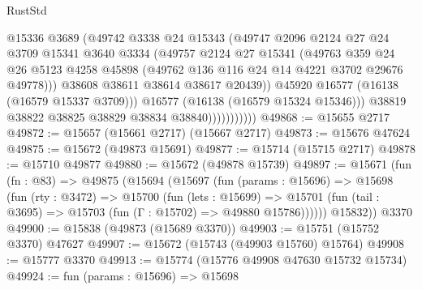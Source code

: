 \begin{lexlean}{RustStd}
\begin{coremodule}
                              @15336
                              @3689
                              (@49742
                                @3338
                                @24
                                @15343
                                (@49747
                                  @2096
                                  @2124
                                  @27
                                  @24
                                  @3709
                                  @15341
                                  @3640
                                  @3334
                                  (@49757
                                    @2124
                                    @27
                                    @15341
                                    (@49763
                                      @359
                                      @24
                                      @26
                                      @5123
                                      @4258
                                      @45898
                                      (@49762 @136 @116 @24 @14 @4221 @3702 @29676 @49778)))
                                  @38608
                                  @38611
                                  @38614
                                  @38617
                                  @20439))
                              @45920
                              @16577
                              (@16138 (@16579 @15337 @3709)))
                            @16577
                            (@16138 (@16579 @15324 @15346)))
                          @38819
                          @38822
                          @38825
                          @38829
                          @38834
                          @38840)))))))))))
@49868 := @15655 @2717
@49872 := @15657 (@15661 @2717) (@15667 @2717)
@49873 := @15676 @47624
@49875 := @15672 (@49873 @15691)
@49877 := @15714 (@15715 @2717)
@49878 := @15710 @49877
@49880 := @15672 (@49878 @15739)
@49897 := @15671
    (fun (fn : @83) =>
    @49875
      (@15694
        (@15697
          (fun (params : @15696) =>
          @15698
            (fun (rty : @3472) =>
            @15700
              (fun (lets : @15699) =>
              @15701 (fun (tail : @3695) => @15703 (fun (Γ : @15702) => @49880 @15786))))))
        @15832))
    @3370
@49900 := @15838 (@49873 (@15689 @3370))
@49903 := @15751 (@15752 @3370) @47627
@49907 := @15672 (@15743 (@49903 @15760) @15764)
@49908 := @15777 @3370
@49913 := @15774 (@15776 @49908 @47630 @15732 @15734)
@49924 := fun (params : @15696) =>
  @15698

\end{coremodule}
\end{lexlean}

